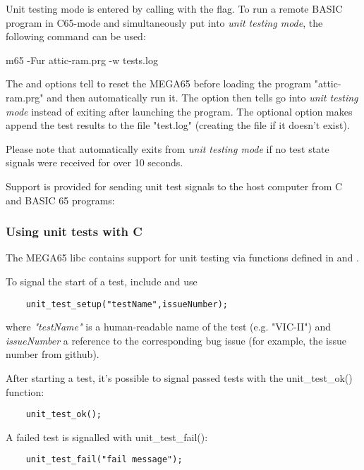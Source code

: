 Unit testing mode is entered by calling  with the  flag. 
To run a remote BASIC program in C65-mode and simultaneously put 
into \textit{unit testing mode}, the following command can be used:

\begin{screenoutput}
    m65 -Fur attic-ram.prg -w tests.log
\end{screenoutput}

The  and  options tell  to reset the MEGA65
before loading the program "attic-ram.prg" and then automatically run it. 
The  option then tells  go into \textit{unit testing mode} 
instead of exiting after launching the program.
The optional  option makes  append the test results to the 
file "test.log" (creating the file if it doesn't exist). 

Please note that  automatically exits from \textit{unit testing mode}
if no test state signals were received for over 10 seconds.

Support is provided for sending unit test signals to the host computer from
C and BASIC 65 programs:

\subsubsection{Using unit tests with C}

The MEGA65 libc contains support for unit testing via functions defined in 
 and . 

To signal the start of a test, include  and use

\begin{verbatim}
    unit_test_setup("testName",issueNumber);
\end{verbatim}

where \textit{"testName"} is a human-readable name of the test (e.g. 
"VIC-II") and \textit{issueNumber} a reference to the corresponding
bug issue (for example, the issue number from github).

After starting a test, it's possible to signal passed tests with 
the unit\_test\_ok() function:

\begin{verbatim}
    unit_test_ok();
\end{verbatim}

A failed test is signalled with unit\_test\_fail():

\begin{verbatim}
    unit_test_fail("fail message");
\end{verbatim}

